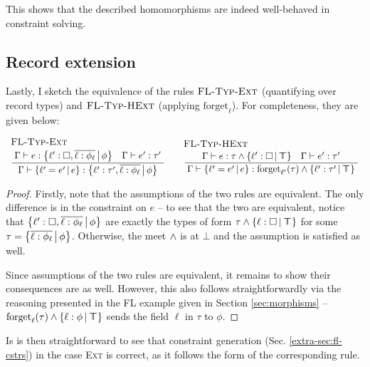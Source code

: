 This shows that the described homomorphisms are indeed well-behaved in constraint solving.

\needspace{6em}
\subsection{Record extension}

Lastly, I sketch the equivalence of the rules $\textsc{FL-Typ-Ext}$ (quantifying over record types) and $\textsc{FL-Typ-HExt}$ (applying $\mathrm{forget}_\ell$). For completeness, they are given below:
$$
\irule{FL-Typ-Ext}
    {\Gamma \vdash e : \flext{\ell' : \flabsent, \overline{\ell : \phi_\ell}}{\phi} \quad \Gamma \vdash e' : \tau'}
    {\Gamma \vdash \flext{\ell' = e'}{e} : \flext{\ell' : \tau', \overline{\ell : \phi_\ell}}{\phi}}
\quad 
\irule{FL-Typ-HExt}{\Gamma \vdash e : \tau \meet \flext{\ell' : \flabsent}{\flftop} \quad \Gamma \vdash e' : \tau'}{\Gamma \vdash \flext{\ell' = e'}{e} : \mathrm{forget}_{\ell'}(\tau) \meet \flext{\ell' : \tau'}{\flftop}}
$$
\begin{proof}
    Firstly, note that the assumptions of the two rules are equivalent. The only difference is in the constraint on $e$ -- to see that the two are equivalent, notice that $\flext{\ell' : \flabsent, \overline{\ell : \phi_\ell}}{\phi}$ are exactly the types of form $\tau \meet \flext{\ell : \flabsent}{\flftop}$ for some $\tau = \flext{\overline{\ell : \phi_\ell}}{\phi}$. Otherwise, the meet $\land$ is at $\bot$ and the assumption is satisfied as well.

    Since assumptions of the two rules are equivalent, it remains to show their consequences are as well. However, this also follows straightforwardly via the reasoning presented in the FL example given in Section \ref{sec:morphisms} -- $\mathrm{forget}_\ell(\tau) \meet \flext{\ell : \phi}{\flftop}$ sends the field $\ell$ in $\tau$ to $\phi$. 
\end{proof}

Is is then straightforward to see that constraint generation (Sec. \ref{extra-sec:fl-cstrs}) in the case \textsc{Ext} is correct, as it follows the form of the corresponding rule.
